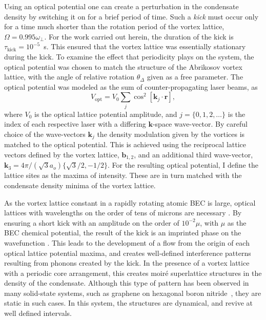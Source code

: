 Using an optical potential one can create a perturbation in the condensate density by switching it on for a brief period of time. Such a {\it kick} must occur only for a time much shorter than the rotation period of the vortex lattice, $\Omega = 0.995\omega_\perp$. For the work carried out herein, the duration of the kick is  $\tau_{\text{kick}}=10^{-5}$~s. This ensured that the vortex lattice was essentially stationary during the kick. To examine the effect that periodicity plays on the system, the optical potential was chosen to match the structure of the Abrikosov vortex lattice, with the angle of relative rotation $\theta_\Delta$ given as a free parameter. The optical potential was modeled as the sum of counter-propagating laser beams, as
\begin{equation}
    V_{\text{opt}} = V_0\displaystyle\sum_{j}\cos^2 \left[ \textbf{k}_{j}\cdot\textbf{r} \right],
\end{equation}
where $V_0$ is the optical lattice potential amplitude, and $j=\lbrace 0,1,2,\ldots \rbrace$ is the index of each respective laser with a differing $\mathbf{k}$-space wave-vector. By careful choice of the wave-vectors $\textbf{k}_{j}$ the density modulation given by the vortices is matched to the optical potential. This is achieved using the reciprocal lattice vectors defined by the vortex lattice, $\mathbf{b}_{1,2}$, and an additional third wave-vector, $\mathbf{k}_3 = 4\pi/(\sqrt{3}a_o)\{\sqrt{3}/2,-1/2\}$. For the resulting optical potential, I define the lattice sites as the maxima of intensity. These are in turn matched with the condensate density minima of the vortex lattice.


As the vortex lattice constant in a rapidly rotating atomic BEC is large, optical lattices with wavelengths on the order of tens of microns are necessary \cite{BEC:Fallani_optexp_2005, AO:Williams_optexp_2008}. By ensuring a short kick with an amplitude on the order of $10^{-2} \mu $, with $\mu$ as the BEC chemical potential, the result of the kick is an imprinted phase on the wavefunction \cite{Vtx:Dobrek_pra_1999}. This leads to the development of a flow from the origin of each optical lattice potential maxima, and creates well-defined interference patterns resulting from phonons created by the kick. In the presence of a vortex lattice with a periodic core arrangement, this creates moir\'e superlattice structures \cite{SS:Murata_acsn_2010} in the density of the condensate. Although this type of pattern has been observed in many solid-state systems, such as graphene on hexagonal boron nitride~\cite{SS:Yankowitz_natphys_2012}, they are static in such cases. In this system, the structures are dynamical, and revive at well defined intervals.


